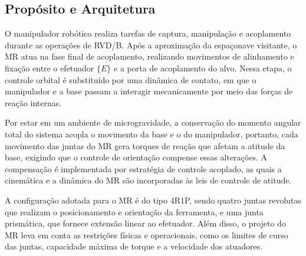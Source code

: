 \subsection{Propósito e Arquitetura}
\label{sec:proposito_arquitetura}

O manipulador robótico realiza tarefas de captura, manipulação e acoplamento durante as operações de RVD/B.
Após a aproximação da espaçonave visitante, o MR atua na fase final de acoplamento, realizando movimentos de alinhamento e fixação entre o efetuador $\{E\}$ e a porta de acoplamento do alvo.
Nessa etapa, o controle orbital é substituído por uma dinâmica de contato, em que o manipulador e a base passam a interagir mecanicamente por meio das forças de reação internas.

Por estar em um ambiente de microgravidade, a conservação do momento angular total do sistema acopla o movimento da base e o do manipulador, portanto, cada movimento das juntas do MR gera torques de reação que afetam a atitude da base, exigindo que o controle de orientação compense essas alterações.
A compensação é implementada por estratégia de controle acoplado, as quais a cinemática e a dinâmica do MR são incorporadas às leis de controle de atitude.

A configuração adotada para o MR é do tipo 4R1P, sendo quatro juntas revolutas que realizam o posicionamento e orientação da ferramenta, e uma junta prismática, que fornece extensão linear ao efetuador.
Além disso, o projeto do MR leva em conta as restrições físicas e operacionais, como os limites de curso das juntas, capacidade máxima de torque e a velocidade dos atuadores.
